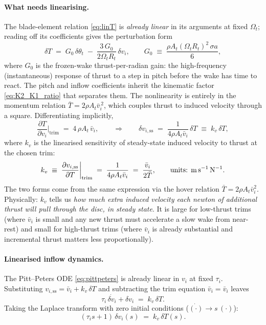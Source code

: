 \documentclass[11pt,a4paper]{article}
\newcommand{\OmegaT}{\Omega_t}
\newcommand{\Rt}{R_t}
\newcommand{\At}{A_t}
\newcommand{\thetat}{\theta_t}
\newcommand{\vi}{v_i}
\newcommand{\viss}{v_{i,\text{ss}}}
\newcommand{\bvi}{\bar{v}_i}
\newcommand{\bT}{\bar{T}}
\begin{document}
\paragraph{What needs linearising.}
The blade-element relation \eqref{eq:linT} is \emph{already linear} in
its arguments at fixed \(\OmegaT\); reading off its coefficients gives the
perturbation form
\begin{equation}
\delta T \;=\; G_0\,\delta\thetat \;-\; \frac{3\,G_0}{2\OmegaT\Rt}\,\delta\vi,
\qquad
G_0 \;\equiv\; \frac{\rho\At(\OmegaT\Rt)^2\,\sigma a}{6},
\label{eq:bemt_perturbed}
\end{equation}
where \(G_0\) is the frozen-wake thrust-per-radian gain: the
high-frequency (instantaneous) response of thrust to a step in pitch
before the wake has time to react. The pitch and inflow coefficients
inherit the kinematic factor \eqref{eq:K2_K1_ratio} that separates them.
The nonlinearity is entirely in the momentum relation
\(\bT = 2\rho\At\bvi^{\,2}\), which couples thrust to induced velocity
through a square. Differentiating implicitly,
\begin{equation}
\frac{\partial T}{\partial \vi}\bigg|_{\text{trim}}
   \;=\; 4\,\rho\At\,\bvi,
\qquad\Longrightarrow\qquad
\delta\viss \;=\; \frac{1}{4\rho\At\bvi}\,\delta T
            \;\equiv\; k_v\,\delta T,
\label{eq:kv}
\end{equation}
where \(k_v\) is the linearised sensitivity of steady-state induced
velocity to thrust at the chosen trim:
\begin{equation}
k_v \;\equiv\; \frac{\partial \viss}{\partial T}\bigg|_{\text{trim}}
   \;=\; \frac{1}{4\rho\At\bvi}
   \;=\; \frac{\bvi}{2\bT},
\qquad\text{units: \si{\metre\per\second\per\newton}}.
\end{equation}
The two forms come from the same expression via the hover relation
\(\bT=2\rho\At\bvi^{2}\). Physically: \(k_v\) tells us \emph{how much
extra induced velocity each newton of additional thrust will pull
through the disc, in steady state}. It is large for low-thrust trims
(where \(\bvi\) is small and any new thrust must accelerate a slow wake
from near-rest) and small for high-thrust trims (where \(\bvi\) is
already substantial and incremental thrust matters less proportionally).

\paragraph{Linearised inflow dynamics.}
The Pitt--Peters ODE \eqref{eq:pittpeters} is already linear in \(\vi\)
at fixed \(\tau_i\). Substituting \(\viss = \bvi + k_v\,\delta T\) and
subtracting the trim equation \(\bvi = \bvi\) leaves
\begin{equation}
\tau_i\,\dot{\delta\vi} + \delta\vi \;=\; k_v\,\delta T.
\end{equation}
Taking the Laplace transform with zero initial conditions
(\(\dot{(\cdot)} \to s\,(\cdot)\)):
\begin{equation}
(\tau_i s + 1)\,\delta\vi(s) \;=\; k_v\,\delta T(s).
\label{eq:dvi_laplace}
\end{equation}
\end{document}
